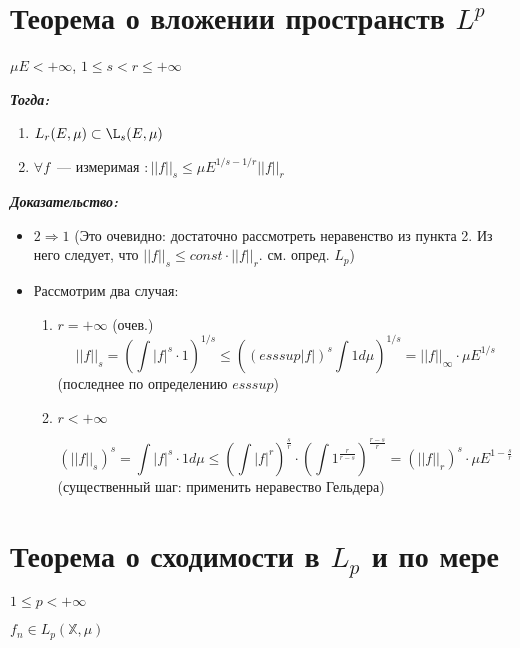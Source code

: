 \documentclass[paper=a4, fontsize=17pt]{article}
\begin{document}
\section{Теорема о вложении пространств $L^p$}

$ \mu E < +\infty$, $1 \leq s < r \leq + \infty$

\textbf{\emph{Тогда:}}

\begin{enumerate}
	\item $ L_r(E, \mu)  \subset \L_s(E, \mu)$
	\item $ \forall f$~--- измеримая $: ||f||_s \leq \mu E^{1/s - 1/r} ||f||_r$
\end{enumerate}

\textbf{\emph{Доказательство:}}

\begin{itemize}
	\item $2 \Rightarrow 1$ (Это очевидно: достаточно рассмотреть неравенство из пункта 2. Из него следует, что $ ||f||_s \leq const \cdot ||f||_r $. см. опред. $ L_p $)

	\item Рассмотрим два случая:
	\begin{enumerate}
		\item $ r = + \infty $ (очев.)
		$$ ||f||_s = (\int |f|^s \cdot 1)^{1/s} \leq ((esssup|f|)^s \int 1 d\mu)^{1/s} = ||f||_{\infty} \cdot \mu E^{1/s} $$ (последнее по определению $ esssup $)

		\item $ r < + \infty $

		$$ (||f||_s)^{s} = \int |f|^s \cdot 1 d\mu  \leq
		(\int |f|^r)^\frac{s}{r} \cdot (\int 1^\frac{r}{r - s})^\frac{r - s}{r} =
		(||f||_r)^s \cdot \mu E^{1 - \frac{s}{r}} $$ (существенный шаг: применить неравество Гельдера)
	\end{enumerate}
\end{itemize}

\section{Теорема о сходимости в $L_p$ и по мере}
$ 1 \leq p < +\infty $

$ f_n \in L_p(\mathbb{X}, \mu)$
\end{document}
